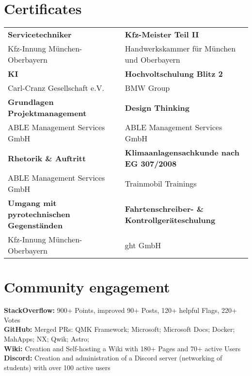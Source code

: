 \documentclass[letterpaper,11pt]{article}
\newcommand{\resumeSubHeadingListStart}{\begin{itemize}[leftmargin=0.15in, label={}]}
\newcommand{\resumeSubHeadingListEnd}{\end{itemize}}
\begin{document}
  \section{Certificates}
  \hspace*{5mm} 
  \begin{tabular}{@{}p{} p{}}
    \textbf{Servicetechniker} & \textbf{Kfz-Meister Teil II} \\[0.5em]
    Kfz-Innung München-Oberbayern & Handwerkskammer für München und Oberbayern \\[0.5em]
    \textbf{KI} & \textbf{Hochvoltschulung Blitz 2} \\[0.5em]
    Carl-Cranz Gesellschaft e.V. & BMW Group \\[0.5em]
    \textbf{Grundlagen Projektmanagement} & \textbf{Design Thinking} \\[0.5em]
    ABLE Management Services GmbH & ABLE Management Services GmbH \\[0.5em]
    \textbf{Rhetorik \& Auftritt} & \textbf{Klimaanlagensachkunde nach EG 307/2008} \\[0.5em]
    ABLE Management Services GmbH & Trainmobil Trainings \\[0.5em]
    \textbf{Umgang mit pyrotechnischen Gegenständen} & \textbf{Fahrtenschreiber- \& Kontrollgeräteschulung} \\[0.5em]
    Kfz-Innung München-Oberbayern & ght GmbH \\[0.5em]
  \end{tabular}




  \section{Community engagement}
  \vspace{2pt}
  \resumeSubHeadingListStart
  \small{\item{
      \textbf{StackOverflow: }{900+ Points, improved 90+ Posts, 120+ helpful Flags, 220+ Votes} \\ \vspace{3pt}
      \textbf{GitHub: }{Merged PRs: QMK Framework; Microsoft; Microsoft Docs; Docker; MahApps; NX; Qwik; Astro;} \\ \vspace{4pt}
      \textbf{Wiki: }{Creation and Self-hosting a Wiki with 180+ Pages and 70+ active Users} \\ \vspace{4pt}
      \textbf{Discord: }{Creation and administration of a Discord server (networking of students) with over 100 active users} \\ \vspace{4pt}
  }}
  \resumeSubHeadingListEnd

  
\end{document}
